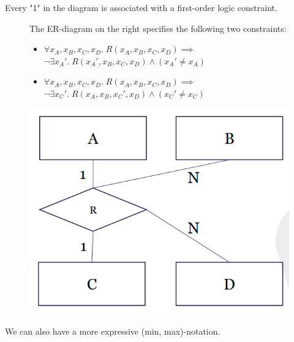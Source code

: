 Every "1" in the diagram is associated with a first-order logic constraint.
\begin{figure}[H]
\begin{minipage}{.5\textwidth}
The ER-diagram on the right specifies the following two constraints:
\begin{itemize}
\item $\forall x_A, x_B, x_C, x_D.\; R(x_A, x_B, x_C, x_D) \implies$\\
$\neg\exists x_A'.\;R(x_A', x_B, x_C, x_D) \land (x_A' \neq x_A)$
\item $\forall x_A, x_B, x_C, x_D.\; R(x_A, x_B, x_C, x_D) \implies$\\
$\neg\exists x_C'.\;R(x_A, x_B, x_C', x_D) \land (x_C' \neq x_C)$
\end{itemize}
\end{minipage}
\begin{minipage}{.5\textwidth}
\includegraphics[width=.8\textwidth]{images/cardinality.PNG}
\end{minipage}
\end{figure}
\noindent We can also have a more expressive (min, max)-notation.
